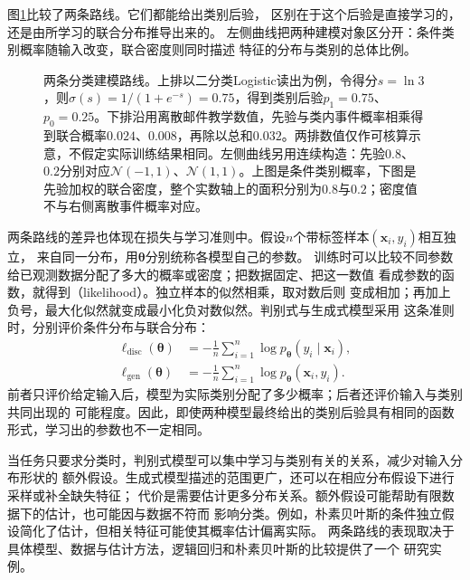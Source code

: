 图\ref{fig:models-discriminative-generative}比较了两条路线。它们都能给出类别后验，
区别在于这个后验是直接学习的，还是由所学习的联合分布推导出来的。
左侧曲线把两种建模对象区分开：条件类别概率随输入改变，联合密度则同时描述
特征的分布与类别的总体比例。

\begin{figure}[!htb]
  \centering
  
  \caption{两条分类建模路线。上排以二分类Logistic读出为例，令得分$s=\ln3$，则$\sigma(s)=1/(1+e^{-s})=0.75$，得到类别后验$p_1=0.75$、$p_0=0.25$。下排沿用离散邮件教学数值，先验与类内事件概率相乘得到联合概率$0.024$、$0.008$，再除以总和$0.032$。两排数值仅作可核算示意，不假定实际训练结果相同。左侧曲线另用连续构造：先验$0.8$、$0.2$分别对应$\mathcal N(-1,1)$、$\mathcal N(1,1)$。上图是条件类别概率，下图是先验加权的联合密度，整个实数轴上的面积分别为$0.8$与$0.2$；密度值不与右侧离散事件概率对应。}
  \label{fig:models-discriminative-generative}
\end{figure}

两条路线的差异也体现在损失与学习准则中。假设$n$个带标签样本$(\bm{x}_i,y_i)$相互独立，
来自同一分布，用$\bm{\theta}$分别统称各模型自己的参数。
训练时可以比较不同参数给已观测数据分配了多大的概率或密度；把数据固定、把这一数值
看成参数的函数，就得到（likelihood）。独立样本的似然相乘，取对数后则
变成相加；再加上负号，最大化似然就变成最小化负对数似然。判别式与生成式模型采用
这条准则时，分别评价条件分布与联合分布：
\begin{align}
  \ell_{\mathrm{disc}}(\bm{\theta})
    &=-\frac{1}{n}\sum_{i=1}^{n}
      \log p_{\bm{\theta}}(y_i\mid\bm{x}_i),
    \label{eq:models-discriminative-objective}\\
  \ell_{\mathrm{gen}}(\bm{\theta})
    &=-\frac{1}{n}\sum_{i=1}^{n}
      \log p_{\bm{\theta}}(\bm{x}_i,y_i).
    \label{eq:models-generative-objective}
\end{align}
前者只评价给定输入后，模型为实际类别分配了多少概率；后者还评价输入与类别共同出现的
可能程度。因此，即使两种模型最终给出的类别后验具有相同的函数形式，学习出的参数也不一定相同。

当任务只要求分类时，判别式模型可以集中学习与类别有关的关系，减少对输入分布形状的
额外假设。生成式模型描述的范围更广，还可以在相应分布假设下进行采样或补全缺失特征；
代价是需要估计更多分布关系。额外假设可能帮助有限数据下的估计，也可能因与数据不符而
影响分类。例如，朴素贝叶斯的条件独立假设简化了估计，但相关特征可能使其概率估计偏离实际。
两条路线的表现取决于具体模型、数据与估计方法，逻辑回归和朴素贝叶斯的比较提供了一个
研究实例。

